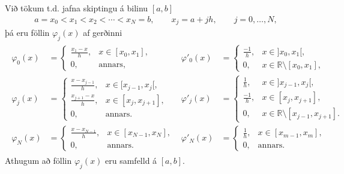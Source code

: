 \documentclass[a4paper,10pt,icelandic]{sphinxmanual}
\begin{document}
Við tökum t.d. jafna skiptingu á bilinu \([a,b]\)
\begin{equation*}
\begin{split}a=x_0<x_1<x_2<\cdots <x_N=b, \qquad x_j= a + j h, \qquad j=0, \dots, N,\end{split}
\end{equation*}
þá eru föllin \(\varphi_j(x)\) af gerðinni
\begin{equation*}
\begin{split}\begin{aligned}
\varphi_0(x)&=\begin{cases} \tfrac{x_1-x}{h}, &x\in [x_0,x_1],\\
0, &\text{annars},
\end{cases} &
\varphi'_0(x)&=\begin{cases} \tfrac{-1}{h}, &x\in ]x_0,x_1[,\\
0, &x\in {{\mathbb  R}}\setminus [x_0,x_1],
\end{cases}
\nonumber
\\
\varphi_j(x)&=\begin{cases} \tfrac{x-x_{j-1}}{h}, &x\in [x_{j-1},x_j[,\\
\tfrac{x_{j+1}-x}{h}, &x\in [x_j,x_{j+1}],\\
0, &\text{annars}.
\end{cases}&
\varphi'_j(x)&=\begin{cases} \tfrac{1}{h}, &x\in ]x_{j-1},x_j[,\\
\tfrac{-1}{h}, &x\in [x_j,x_{j+1}],\\
0, &x\in {{\mathbb  R}}\setminus [x_{j-1},x_{j+1}].
\end{cases}
\\
\varphi_N(x)&=\begin{cases} \tfrac{x-x_{N-1}}{h}, &x\in [x_{N-1},x_N],\\
0, &\text{annars}. \nonumber
\end{cases}&
\varphi'_N(x)&=\begin{cases} \tfrac{1}{h}, &x\in [x_{m-1},x_m],\\
0, &\text{annars}. \nonumber
\end{cases}\end{aligned}\end{split}
\end{equation*}
Athugum að föllin \(\varphi_j(x)\) eru samfelld á \([a,b]\).

\end{document}
